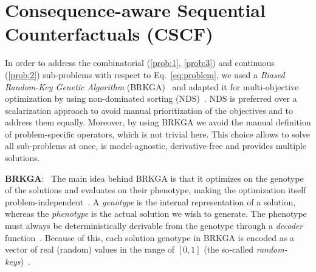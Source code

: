\documentclass[runningheads, envcountsame, a4paper]{llncs}
\newcommand{\Ours}{Consequence-aware Sequential Counterfactuals}
\begin{document}
\section{\Ours{} (CSCF)}
\label{sec:method}
In order to address the combinatorial (\ref{prob:1}, \ref{prob:3}) and continuous (\ref{prob:2}) sub-problems with respect to Eq.~\ref{eq:problem}, we used a \emph{Biased Random-Key Genetic Algorithm} (BRKGA)~\cite{goncalvesBiasedRandomkeyGenetic2011} and adapted it for multi-objective optimization by using non-dominated sorting (NDS)~\cite{srinivasMuiltiobjectiveOptimizationUsing1994}. 
NDS is preferred over a scalarization approach to avoid manual prioritization of the objectives and to address them equally.
Moreover, by using BRKGA we avoid the manual definition of problem-specific operators, which is not trivial here.
This choice allows to solve all sub-problems at once, is model-agnostic, derivative-free and provides multiple solutions.

\textbf{BRKGA}: \,
The main idea behind BRKGA is that it optimizes on the genotype of the solutions and evaluates on their phenotype, making the optimization itself problem-independent~\cite{goncalvesBiasedRandomkeyGenetic2011}. A \emph{genotype} is the internal representation of a solution, whereas the \emph{phenotype} is the actual solution we wish to generate. The phenotype must always be deterministically derivable from the genotype through a \emph{decoder} function~\cite{goncalvesBiasedRandomkeyGenetic2011}.
Because of this, each solution genotype in BRKGA is encoded as a vector of real (random) values in the range of $[0,1]$ (the so-called \emph{random-keys})~\cite{goncalvesBiasedRandomkeyGenetic2011}.
\end{document}
